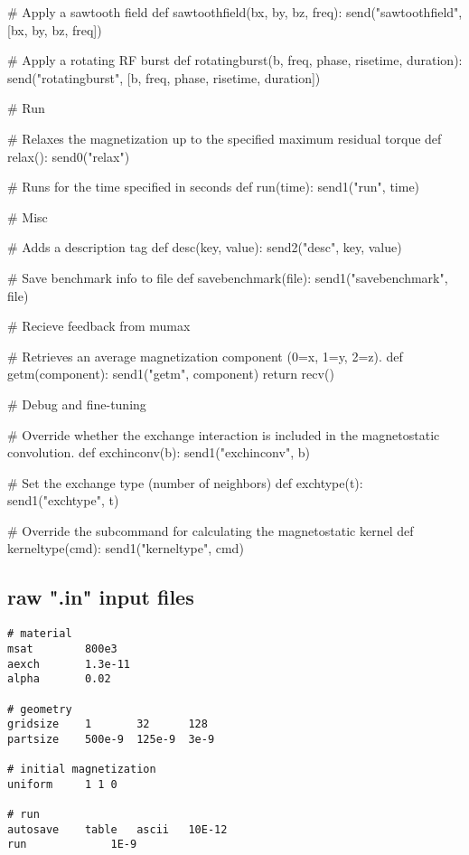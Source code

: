 # Apply a sawtooth field
def sawtoothfield(bx, by, bz, freq):
	send("sawtoothfield", [bx, by, bz, freq])

# Apply a rotating RF burst
def rotatingburst(b, freq, phase, risetime, duration):
	send("rotatingburst", [b, freq, phase, risetime, duration])

# Run

# Relaxes the magnetization up to the specified maximum residual torque
def relax():
	send0("relax")

# Runs for the time specified in seconds
def run(time):
	send1("run", time)


# Misc

# Adds a description tag
def desc(key, value):
	send2("desc", key, value)	

# Save benchmark info to file
def savebenchmark(file):
	send1("savebenchmark", file)


# Recieve feedback from mumax

# Retrieves an average magnetization component (0=x, 1=y, 2=z).
def getm(component):
	send1("getm", component)
	return recv()


# Debug and fine-tuning

# Override whether the exchange interaction is included in the magnetostatic convolution.
def exchinconv(b):
	send1("exchinconv", b)

# Set the exchange type (number of neighbors)
def exchtype(t):
	send1("exchtype", t)

# Override the subcommand for calculating the magnetostatic kernel
def kerneltype(cmd):
	send1("kerneltype", cmd)


\subsection{raw ".in" input files}


\begin{verbatim}
# material
msat       	800e3 
aexch      	1.3e-11
alpha      	0.02

# geometry 
gridsize	1     	32      128    
partsize	500e-9	125e-9 	3e-9

# initial magnetization
uniform		1 1 0

# run
autosave	table	ascii	10E-12
run          	1E-9
\end{verbatim}

\newcommand{\defcommand}[2][\space]{\textbf{#2}\index{#2}\label{#2} \textit{#1}}
\newcommand{\command}[1]{\hyperref[#1]{\textbf{#1}}\index{#1}\label{#1}}

